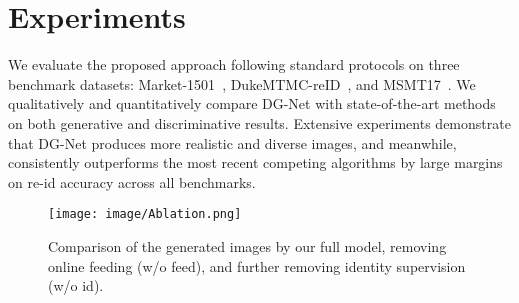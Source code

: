 \documentclass[10pt,twocolumn,letterpaper]{article}
\begin{document}
\section{Experiments}
We evaluate the proposed approach following standard protocols on three benchmark datasets: Market-1501~\cite{zheng2015scalable}, DukeMTMC-reID~\cite{ristani2016MTMC,zheng2017unlabeled}, and MSMT17~\cite{wei2018person}. We qualitatively and quantitatively compare DG-Net with state-of-the-art methods on both generative and discriminative results. Extensive experiments demonstrate that DG-Net produces more realistic and diverse images, and meanwhile, consistently outperforms the most recent competing algorithms by large margins on re-id accuracy across all benchmarks.       

\begin{figure}[t]
\vspace{-2mm}
\begin{center}
\texttt{[image: image/Ablation.png]}
\end{center}
\vspace{-.2in}
   \caption{Comparison of the generated images by our full model, removing online feeding (w/o feed), and further removing identity supervision (w/o id). 
   }
\label{fig:ablation}
\end{figure}
\end{document}
